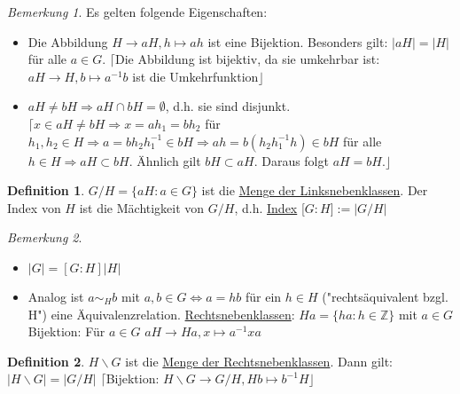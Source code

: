 \documentclass[fleqn, 12pt]{scrartcl}
\theoremstyle{definition}
\newtheorem*{defn}{Definition}
\theoremstyle{remark}
\newtheorem*{nb}{Bemerkung}
\begin{document}
\begin{nb}
	Es gelten folgende Eigenschaften: 
	\begin{itemize}
		\item Die Abbildung $H \rightarrow aH, h \mapsto ah$ ist eine Bijektion. Besonders gilt: $\vert aH \vert = \vert H \vert$ für alle $a \in G$. \newline $\lceil$Die Abbildung ist bijektiv, da sie umkehrbar ist: $aH \rightarrow H, b \mapsto a^{-1}b$ ist die Umkehrfunktion$\rfloor$
		\item $aH \neq bH \Rightarrow aH \cap bH = \emptyset$, d.h. sie sind disjunkt. \newline $\lceil x \in aH \neq bH \Rightarrow x = ah_{1} = bh_{2}$ für $h_{1},h_{2} \in H \Rightarrow a=bh_{2}h_{1}^{-1} \in bH \Rightarrow ah= b(h_{2}h_{1}^{-1}h) \in bH$ für alle $h \in H \Rightarrow aH \subset bH$. Ähnlich gilt $bH \subset aH$. Daraus folgt $aH=bH.\rfloor$
	\end{itemize}
\end{nb}

\begin{defn}
	$G/H = \lbrace aH : a \in G \rbrace$ ist die \underline{Menge der Linksnebenklassen}. \newline Der Index von $H$ ist die Mächtigkeit von $G/H$, d.h. \underline{Index} [$G:H$]$:=\vert G/H \vert$
\end{defn}

\begin{nb}
	\begin{itemize}
	 	\item $\vert G \vert = [G:H]\vert H\vert$
	 	\item Analog ist $a \sim_{H} b$ mit $a,b \in G \Leftrightarrow a=hb$ für ein $h \in H$ ("rechtsäquivalent bzgl. H") eine Äquivalenzrelation. \newline \underline{Rechtsnebenklassen}: $Ha=\lbrace ha : h \in \mathbb{Z} \rbrace$ mit $a \in G$ \newline Bijektion: Für $a \in G$ $aH \rightarrow Ha, x \mapsto a^{-1}xa$
	\end{itemize}
\end{nb}

\begin{defn}
	$H \backslash G$ ist die \underline{Menge der Rechtsnebenklassen}. Dann gilt: $\vert H \backslash G \vert = \vert G/H \vert$ \newline $\lceil$Bijektion: $H \backslash G \rightarrow G/H, Hb \mapsto b^{-1}H \rfloor$
\end{defn}
\end{document}
